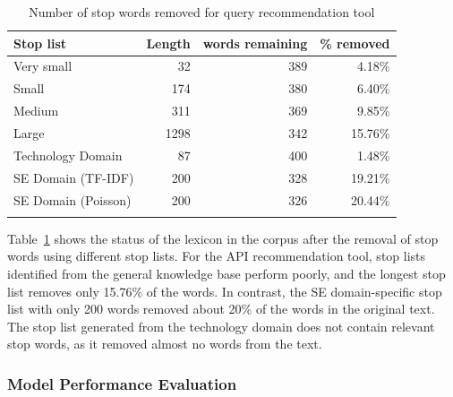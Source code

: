 \documentclass[conference]{IEEEtran}
\begin{document}
\begin{sloppy}
\begin{table}[]
\centering
\caption{Number of stop words removed for query recommendation tool}
\begin{tabular}{lrrr}
\toprule
Stop list              & Length & words remaining  & \% removed \\
\midrule
Very small            & 32     & 389                                                                                                    & 4.18\%                            \\
Small                 & 174    & 380                                                                                                    & 6.40\%                            \\
Medium                & 311    & 369                                                                                                    & 9.85\%                            \\
Large                 & 1298   & 342                                                                                                    & 15.76\%                           \\
Technology   Domain   & 87     & 400                                                                                                    & 1.48\%                            \\
SE Domain   (TF-IDF)  & 200    & 328                                                                                                    & 19.21\%                           \\
SE Domain   (Poisson) & 200    & 326                                                                                                    & 20.44\%                           \\
\bottomrule
\label{table:five}
\end{tabular}
\end{table}

Table~\ref{table:five} shows the status of the lexicon in the corpus after the removal of stop words using different stop lists. For the API recommendation tool, stop lists identified from the general knowledge base perform poorly, and the longest stop list removes only 15.76\% of the words. In contrast, the SE domain-specific stop list with only 200 words removed about 20\% of the words in the original text. The stop list generated from the technology domain does not contain relevant stop words, as it removed almost no words from the text. 

\subsubsection{Model Performance Evaluation}


\end{sloppy}
\end{document}
